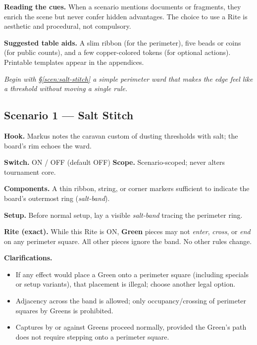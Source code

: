 \documentclass[11pt]{article}
\begin{document}
\medskip
\noindent\textbf{Reading the cues.} When a scenario mentions documents or fragments, they enrich the scene but never confer hidden advantages. The choice to use a Rite is aesthetic and procedural, not compulsory.

\medskip
\noindent\textbf{Suggested table aids.} A slim ribbon (for the perimeter), five beads or coins (for public counts), and a few copper-colored tokens (for optional actions). Printable templates appear in the appendices.

\medskip
\noindent\textit{Begin with \S\ref{scen:salt-stitch} \textemdash{} a simple perimeter ward that makes the edge feel like a threshold without moving a single rule.}

\subsection*{Scenario 1 — Salt Stitch}
\label{scen:salt-stitch}
{}

\noindent\textbf{Hook.} Markus notes the caravan custom of dusting thresholds with salt; the board’s rim echoes the ward.

\medskip
\noindent\textbf{Switch.} \textsc{ON / OFF} (default \textsc{OFF}) \hfill \textbf{Scope.} Scenario-scoped; never alters tournament core.

\medskip
\noindent\textbf{Components.} A thin ribbon, string, or corner markers sufficient to indicate the board’s outermost ring (\emph{salt-band}).

\medskip
\noindent\textbf{Setup.} Before normal setup, lay a visible \emph{salt-band} tracing the perimeter ring.

\medskip
\noindent\textbf{Rite (exact).} While this Rite is \textsc{ON}, \textbf{Green} pieces may not \emph{enter}, \emph{cross}, or \emph{end} on any perimeter square. All other pieces ignore the band. No other rules change.

\medskip
\noindent\textbf{Clarifications.}
\begin{itemize}\setlength\itemsep{0.25em}
  \item If any effect would place a Green onto a perimeter square (including specials or setup variants), that placement is illegal; choose another legal option.
  \item Adjacency across the band is allowed; only occupancy/crossing of perimeter squares by Greens is prohibited.
  \item Captures by or against Greens proceed normally, provided the Green’s path does not require stepping onto a perimeter square.
\end{itemize}
\end{document}
